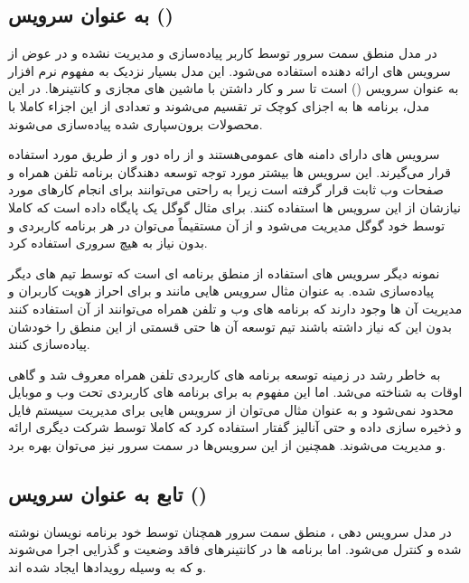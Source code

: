 \subsection{ به عنوان سرویس ()}

در مدل  منطق سمت سرور توسط کاربر پیاده‌سازی و مدیریت نشده و در عوض از سرویس های ارائه دهنده استفاده می‌شود. این مدل بسیار نزدیک به مفهوم نرم افزار به عنوان سرویس () است تا سر و کار داشتن با ماشین های مجازی و کانتینرها. در این مدل، برنامه ها به اجزای کوچک تر تقسیم می‌شوند و تعدادی از این اجزاء کاملا با محصولات برون‌سپاری شده پیاده‌سازی می‌شوند.

سرویس های  دارای دامنه های عمومی‌هستند و از راه دور و از طریق  مورد استفاده قرار می‌گیرند. این سرویس ها بیشتر مورد توجه توسعه دهندگان برنامه تلفن همراه و صفحات وب ثابت قرار گرفته است زیرا به راحتی می‌توانند برای انجام کارهای مورد نیازشان از این سرویس ها استفاده کنند. برای مثال  گوگل یک پایگاه داده است که کاملا توسط خود گوگل مدیریت می‌شود و از آن مستقیماً می‌توان در هر برنامه کاربردی و بدون نیاز به هیچ سروری استفاده کرد.

نمونه دیگر سرویس های  استفاده از منطق برنامه ای است که توسط تیم های دیگر پیاده‌سازی شده. به عنوان مثال سرویس هایی مانند  و  برای احراز هویت کاربران و مدیریت آن ها وجود دارند که برنامه های وب و تلفن همراه می‌توانند از آن استفاده کنند بدون این که نیاز داشته باشند تیم توسعه آن ها حتی قسمتی از این منطق را خودشان پیاده‌سازی کنند.

 به خاطر رشد در زمینه  توسعه برنامه های کاربردی تلفن همراه معروف شد و گاهی اوقات به  شناخته می‌شد. اما این مفهوم به  برای برنامه های کاربردی تحت وب و موبایل محدود نمی‌شود و به عنوان مثال می‌توان از سرویس هایی برای مدیریت سیستم فایل و ذخیره سازی داده و حتی آنالیز گفتار استفاده کرد که کاملا توسط شرکت دیگری ارائه و مدیریت می‌شوند. همچنین از این سرویس‌ها در سمت سرور نیز می‌توان بهره برد.

\subsection{تابع به عنوان سرویس ()}

در مدل سرویس دهی ، منطق سمت سرور همچنان توسط خود برنامه نویسان نوشته شده و کنترل می‌شود. اما برنامه ها در کانتینرهای فاقد وضعیت و گذرایی اجرا می‌شوند و که به وسیله رویدادها ایجاد شده اند.

